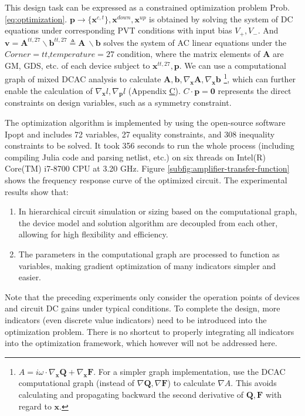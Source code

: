 This design task can be expressed as a constrained optimization problem Prob.\eqref{eq:optimization}. $\bm{p}\to\{\bm{x}^{c,t}\},\bm{x}^{down},\bm{x}^{up}$ is obtained by solving the system of DC equations under corresponding PVT conditions with input bias $V_+,V_-$. And $\bm{v}=\bm{A}^{tt,27}\backslash\bm{b}^{tt,27}\triangleq\bm{A}\ \backslash\bm{b}$ solves the system of AC linear equations under the $Corner=tt$,$temperature=27$ condition, where the matrix elements of $\bm{A}$ are GM, GDS, etc. of each device subject to $\bm{x}^{tt,27},\bm{p}$. We can use a computational graph of mixed DCAC analysis to calculate $\bm{A},\bm{b},\nabla_{\bm{x}}\bm{A},\nabla_{\bm{x}}\bm{b}$ \footnote{$A=i\omega\cdot\nabla_{\bm{x}}\bm{Q}+\nabla_{\bm{x}}\bm{F}$. For a simpler graph implementation, use the DCAC computational graph (instead of $\nabla\bm{Q},\nabla\bm{F}$) to calculate $\nabla A$. This avoids calculating and propagating backward the second derivative of $\bm{Q},\bm{F}$ with regard to $\bm{x}$.}, which can further enable the calculation of $\nabla_{\bm{x}}l,\nabla_{\bm{p}}l$ (Appendix \hyperref[appendix:inv-linear-equation-grad]{C}). $C\cdot\bm{p}=\bm{0}$ represents the direct constraints on design variables, such as a symmetry constraint.

The optimization algorithm is implemented by using the open-source software Ipopt \cite{wachter2006implementation} and includes 72 variables, 27 equality constraints, and 308 inequality constraints to be solved. It took 356 seconds to run the whole process (including compiling Julia code and parsing netlist, etc.) on six threads on Intel(R) Core(TM) i7-8700 CPU at 3.20 GHz. Figure \ref{subfig:amplifier-transfer-function} shows the frequency response curve of the optimized circuit. The experimental results show that:
\begin{enumerate}[partopsep=0pt,topsep=0pt,itemsep=0pt,parsep=0pt]
  \item In hierarchical circuit simulation or sizing based on the computational graph, the device model and solution algorithm are decoupled from each other, allowing for high flexibility and efficiency.
  \item The parameters in the computational graph are processed to function as variables, making gradient optimization of many indicators simpler and easier.
\end{enumerate}
Note that the preceding experiments only consider the operation points of devices and circuit DC gains under typical conditions. To complete the design, more indicators (even discrete value indicators) need to be introduced into the optimization problem. There is no shortcut to properly integrating all indicators into the optimization framework, which however will not be addressed here.




